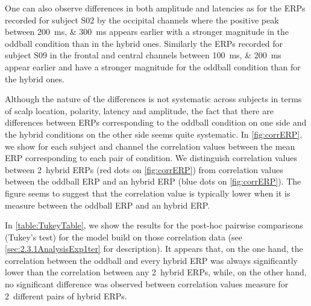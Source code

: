 \documentclass[10pt]{article}
\begin{document}
    One can also observe differences in both amplitude and latencies as for the ERPs recorded for subject S02 by the occipital channels where the positive peak between \SIlist{200;300}{\ms} appears earlier with a stronger magnitude in the oddball condition than in the hybrid ones.
    Similarly the ERPs recorded for subject S09 in the frontal and central channels between \SIlist{100;200}{\ms} appear earlier and have a stronger magnitude for the oddball condition than for the hybrid ones.

    Although the nature of the differences is not systematic across subjects in terms of scalp location, polarity, latency and amplitude, the fact that there are differences between ERPs corresponding to the oddball condition on one side and the hybrid conditions on the other side seems quite systematic. %
    In \autoref{fig:corrERP}, we show for each subject and channel the correlation values between the mean ERP corresponding to each pair of condition.
    We distinguish correlation values between 2~hybrid ERPs (red dots on \autoref{fig:corrERP}) from correlation values between the oddball ERP and an hybrid ERP (blue dots on \autoref{fig:corrERP}).
    The figure seems to suggest that the correlation value is typically lower when it is measure between the oddball ERP and an hybrid ERP.

    In \autoref{table:TukeyTable}, we show the results for the post-hoc pairwise comparisons (Tukey's test) for the model build on those correlation data (see \autoref{sec:2.3.1AnalysisExp1ter} for description).
    It appears that, on the one hand, the correlation between the oddball and every hybrid ERP was always significantly lower than the correlation between any 2~hybrid ERPs, while, on the other hand, no significant difference was observed between correlation values measure for 2~different pairs of hybrid ERPs.

\end{document}

